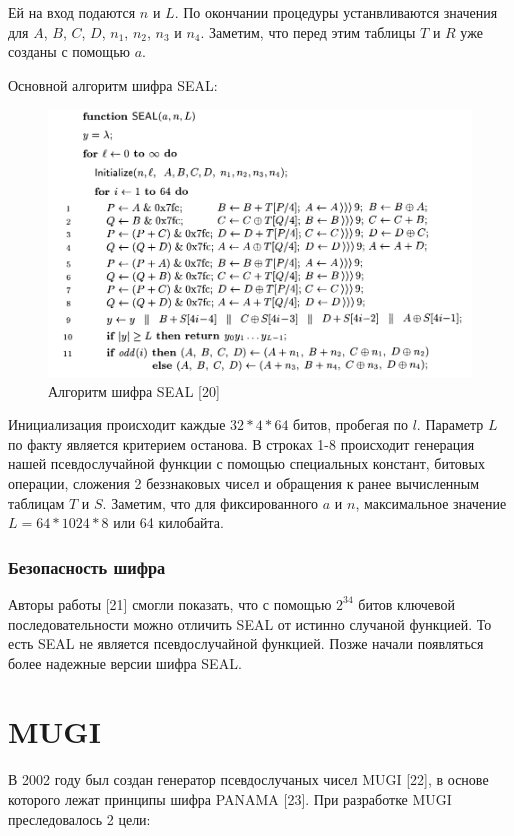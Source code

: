 \documentclass[colorthm]{./civarticle}
\begin{document}
Ей на вход подаются $n$ и $L$. По окончании процедуры устанвливаются значения для $A$, $B$, $C$, $D$, $n_1$, $n_2$, $n_3$ и $n_4$. Заметим, что перед этим таблицы $T$ и $R$ уже созданы с помощью $a$.

Основной алгоритм шифра SEAL:

\begin{figure}[H]
    \centering
    \includegraphics[width=0.75\linewidth]{Снимок экрана 2024-01-12 010838.png}
    \caption{Алгоритм шифра SEAL [20]}
    \label{fig:enter-label}
\end{figure}

Инициализация происходит каждые $32*4*64$ битов, пробегая по $l$. Параметр $L$ по факту является критерием останова. В строках 1-8 происходит генерация нашей псевдослучайной функции с помощью специальных констант, битовых операции, сложения 2 беззнаковых чисел и обращения к ранее вычисленным таблицам $T$ и $S$. Заметим, что для фиксированного $a$ и $n$, максимальное значение $L = 64 * 1024 * 8$ или 64 килобайта.

\subsubsection{Безопасность шифра} 

Авторы работы [21] смогли показать, что с помощью $2^{34}$ битов ключевой последовательности можно отличить SEAL от истинно случаной функцией. То есть SEAL не является псевдослучайной функцией. Позже начали появляться более надежные версии шифра SEAL.


\section{MUGI}

В 2002 году был создан генератор псевдослучаных чисел MUGI [22], в основе которого лежат принципы шифра PANAMA [23]. При разработке MUGI преследовалось 2 цели: 
\end{document}

